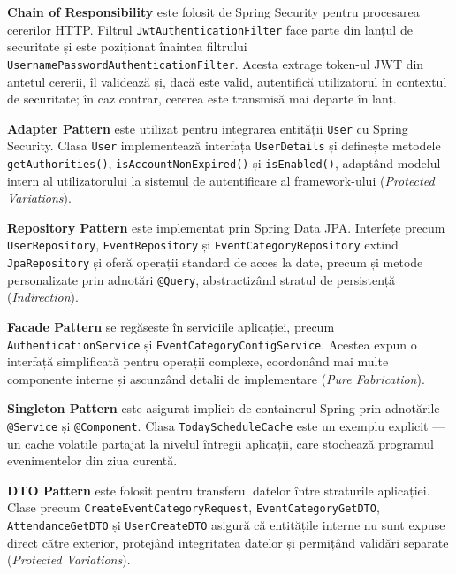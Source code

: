 \documentclass[a4paper,12pt,oneside]{report}
\begin{document}
    \textbf{Chain of Responsibility} \cite{deinum12} este folosit de Spring Security pentru procesarea cererilor HTTP. Filtrul \texttt{JwtAuthenticationFilter} face parte din lanțul de securitate și este poziționat înaintea filtrului \texttt{UsernamePasswordAuthenticationFilter}. Acesta extrage token-ul JWT din antetul cererii, îl validează și, dacă este valid, autentifică utilizatorul în contextul de securitate; în caz contrar, cererea este transmisă mai departe în lanț.

    \textbf{Adapter Pattern} \cite{deinum12} este utilizat pentru integrarea entității \texttt{User} cu Spring Security. Clasa \texttt{User} implementează interfața \texttt{UserDetails} și definește metodele \texttt{getAuthorities()}, \texttt{isAccountNonExpired()} și \texttt{isEnabled()}, adaptând modelul intern al utilizatorului la sistemul de autentificare al framework-ului (\textit{Protected Variations}).

    \textbf{Repository Pattern} \cite{deinum12} este implementat prin Spring Data JPA. \newline Interfețe precum \texttt{UserRepository}, \texttt{EventRepository} și \newline \texttt{EventCategoryRepository} extind \texttt{JpaRepository} și oferă operații standard de acces la date, precum și metode personalizate prin adnotări \texttt{@Query}, abstractizând stratul de persistență (\textit{Indirection}).

    \textbf{Facade Pattern} \cite{grand02} se regăsește în serviciile aplicației, precum \texttt{AuthenticationService} și \texttt{EventCategoryConfigService}. Acestea expun o interfață simplificată pentru operații complexe, coordonând mai multe componente interne și ascunzând detalii de implementare (\textit{Pure Fabrication}).

    \textbf{Singleton Pattern} \cite{deinum12} este asigurat implicit de containerul Spring prin adnotările \texttt{@Service} și \texttt{@Component}. Clasa \texttt{TodayScheduleCache} este un exemplu explicit — un cache volatile partajat la nivelul întregii aplicații, care stochează programul evenimentelor din ziua curentă.

    \textbf{DTO Pattern} \cite{puchianu_iss} este folosit pentru transferul datelor între straturile aplicației. Clase precum \texttt{CreateEventCategoryRequest}, \texttt{EventCategoryGetDTO}, \texttt{AttendanceGetDTO} și \texttt{UserCreateDTO} asigură că entitățile interne nu sunt expuse direct către exterior, protejând integritatea datelor și permițând validări separate (\textit{Protected Variations}).
    \newpage
\end{document}
